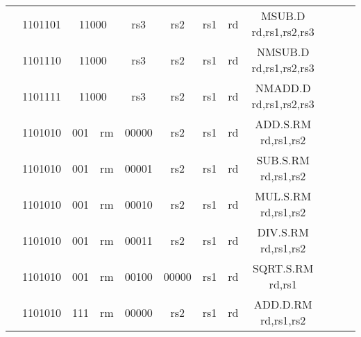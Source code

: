 \begin{table}[p]
\begin{small}
\begin{center}
\begin{tabular}{rcccccccccccl}
&
\multicolumn{1}{|c|}{1101101} &
\multicolumn{2}{c|}{11000} &
\multicolumn{2}{c|}{rs3} &
\multicolumn{1}{c|}{rs2} &
\multicolumn{1}{c|}{rs1} &
\multicolumn{1}{c|}{rd} & MSUB.D rd,rs1,rs2,rs3 \\
\cline{2-9}
  

&
\multicolumn{1}{|c|}{1101110} &
\multicolumn{2}{c|}{11000} &
\multicolumn{2}{c|}{rs3} &
\multicolumn{1}{c|}{rs2} &
\multicolumn{1}{c|}{rs1} &
\multicolumn{1}{c|}{rd} & NMSUB.D rd,rs1,rs2,rs3 \\
\cline{2-9}
  

&
\multicolumn{1}{|c|}{1101111} &
\multicolumn{2}{c|}{11000} &
\multicolumn{2}{c|}{rs3} &
\multicolumn{1}{c|}{rs2} &
\multicolumn{1}{c|}{rs1} &
\multicolumn{1}{c|}{rd} & NMADD.D rd,rs1,rs2,rs3 \\
\cline{2-9}
  

&
\multicolumn{1}{|c|}{1101010} &
\multicolumn{1}{c|}{001} &
\multicolumn{1}{c|}{rm} &
\multicolumn{2}{c|}{00000} &
\multicolumn{1}{c|}{rs2} &
\multicolumn{1}{c|}{rs1} &
\multicolumn{1}{c|}{rd} & ADD.S.RM rd,rs1,rs2 \\
\cline{2-9}
  

&
\multicolumn{1}{|c|}{1101010} &
\multicolumn{1}{c|}{001} &
\multicolumn{1}{c|}{rm} &
\multicolumn{2}{c|}{00001} &
\multicolumn{1}{c|}{rs2} &
\multicolumn{1}{c|}{rs1} &
\multicolumn{1}{c|}{rd} & SUB.S.RM rd,rs1,rs2 \\
\cline{2-9}
  

&
\multicolumn{1}{|c|}{1101010} &
\multicolumn{1}{c|}{001} &
\multicolumn{1}{c|}{rm} &
\multicolumn{2}{c|}{00010} &
\multicolumn{1}{c|}{rs2} &
\multicolumn{1}{c|}{rs1} &
\multicolumn{1}{c|}{rd} & MUL.S.RM rd,rs1,rs2 \\
\cline{2-9}
  

&
\multicolumn{1}{|c|}{1101010} &
\multicolumn{1}{c|}{001} &
\multicolumn{1}{c|}{rm} &
\multicolumn{2}{c|}{00011} &
\multicolumn{1}{c|}{rs2} &
\multicolumn{1}{c|}{rs1} &
\multicolumn{1}{c|}{rd} & DIV.S.RM rd,rs1,rs2 \\
\cline{2-9}
  

&
\multicolumn{1}{|c|}{1101010} &
\multicolumn{1}{c|}{001} &
\multicolumn{1}{c|}{rm} &
\multicolumn{2}{c|}{00100} &
\multicolumn{1}{c|}{00000} &
\multicolumn{1}{c|}{rs1} &
\multicolumn{1}{c|}{rd} & SQRT.S.RM rd,rs1 \\
\cline{2-9}
  

&
\multicolumn{1}{|c|}{1101010} &
\multicolumn{1}{c|}{111} &
\multicolumn{1}{c|}{rm} &
\multicolumn{2}{c|}{00000} &
\multicolumn{1}{c|}{rs2} &
\multicolumn{1}{c|}{rs1} &
\multicolumn{1}{c|}{rd} & ADD.D.RM rd,rs1,rs2 \\
\cline{2-9}
  


\end{tabular}
\end{center}
\end{small}
\end{table}

